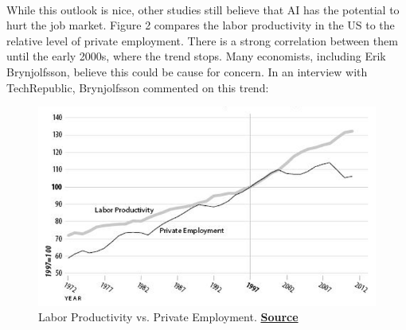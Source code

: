 \documentclass{article}
\begin{document}
      \begin{center}
      \end{center}

    \paragraph{}
      While this outlook is nice, other studies still believe that AI has
      the potential to hurt the job market. Figure 2 compares
      the labor productivity in the US to the relative
      level of private employment. There is a strong correlation between them
      until the early 2000s, where the trend stops. Many economists, including
      Erik Brynjolfsson, believe this could be cause for concern.
      In an interview with TechRepublic, Brynjolfsson
      commented on this trend:

      \begin{figure}[h]
        \centering
        \includegraphics[width=\textwidth,height=\textheight, keepaspectratio]{Figure2}
        \caption{Labor Productivity vs. Private Employment.
                 \href{http://www.techrepublic.com/article/ai-is-destroying-more-jobs-than-it-creates-what-it-means-and-how-we-can-stop-it/}
                 {\textbf{Source}}}
      \end{figure}

      \begin{center}
      \end{center}
\end{document}

